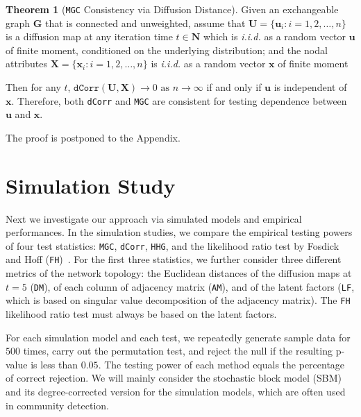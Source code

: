\documentclass[11pt]{article}
\theoremstyle{definition}
\newtheorem{theorem}{Theorem}[section]
\begin{document}
\begin{theorem}[\texttt{MGC} Consistency via Diffusion Distance]
Given an exchangeable graph $\mathbf{G}$ that is connected and unweighted, assume that $\mathbf{U} = \{ \mathbf{u}_{i} : i = 1,2, \ldots, n  \}$ is a diffusion map at any iteration time $t \in \mathbf{N}$ which is \textit{i.i.d.} as a random vector $\mathbf{u}$ of finite moment, conditioned on the underlying distribution; and the nodal attributes $\mathbf{X}=\{ \mathbf{x}_{i} :  i = 1,2, \ldots, n \}$ is \textit{i.i.d.} as a random vector $\mathbf{x}$ of finite moment 

Then for any $t$, $\texttt{dCorr}(\mathbf{U}, \mathbf{X}) \longrightarrow 0 \mbox{ as } n \rightarrow \infty$ if and only if $\mathbf{u}$ is independent of $\mathbf{x}$. Therefore, both \texttt{dCorr} and \texttt{MGC} are consistent for testing dependence between $\mathbf{u}$ and $\mathbf{x}$.
	\label{theoremMain}
\end{theorem}
The proof is postponed to the Appendix.


\section{Simulation Study}
\label{sec:simulation}
	\vspace*{-0.2cm}
Next we investigate our approach via simulated models and empirical performances. In the simulation studies, we compare the empirical testing powers of four test statistics: \texttt{MGC}, \texttt{dCorr}, \texttt{HHG}, and the likelihood ratio test by Fosdick and Hoff (\texttt{FH})~\cite{fosdick2015testing}. For the first three statistics, we further consider three different metrics of the network topology: the Euclidean distances of the diffusion maps at $t=5$ (\texttt{DM}), of each column of adjacency matrix (\texttt{AM}), and of the latent factors (\texttt{LF}, which is based on singular value decomposition of the adjacency matrix). The \texttt{FH} likelihood ratio test must always be based on the latent factors.

For each simulation model and each test, we repeatedly generate sample data for $500$ times, carry out the permutation test, and reject the null if the resulting p-value is less than $0.05$. The testing power of each method equals the percentage of correct rejection. We will mainly consider the stochastic block model (SBM) and its degree-corrected version for the simulation models, which are often used in community detection. 
\end{document}
